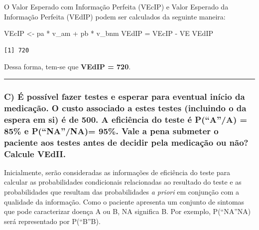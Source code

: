 \documentclass[
  letterpaper,
  DIV=11,
  numbers=noendperiod]{scrartcl}
\newenvironment{Shaded}{\begin{snugshade}}{\end{snugshade}}
\newcommand{\NormalTok}[1]{\textcolor[rgb]{0.00,0.23,0.31}{#1}}
\newcommand{\OtherTok}[1]{\textcolor[rgb]{0.00,0.23,0.31}{#1}}
\newcommand{\SpecialCharTok}[1]{\textcolor[rgb]{0.37,0.37,0.37}{#1}}
\begin{document}
O Valor Esperado com Informação Perfeita (VEcIP) e Valor Esperado da
Informação Perfeita (VEdIP) podem ser calculados da seguinte maneira:

\begin{Shaded}
\begin{Highlighting}[]
\NormalTok{VEcIP }\OtherTok{\textless{}{-}}\NormalTok{ pa }\SpecialCharTok{*}\NormalTok{ v\_am }\SpecialCharTok{+}\NormalTok{ pb }\SpecialCharTok{*}\NormalTok{ v\_bnm}
\NormalTok{VEdIP }\OtherTok{=}\NormalTok{ VEcIP }\SpecialCharTok{{-}}\NormalTok{ VE}
\NormalTok{VEdIP}
\end{Highlighting}
\end{Shaded}

\begin{verbatim}
[1] 720
\end{verbatim}

Dessa forma, tem-se que \textbf{VEdIP = 720}.

\begin{center}\rule{0.5\linewidth}{0.5pt}\end{center}

\hypertarget{c-uxe9-possuxedvel-fazer-testes-e-esperar-para-eventual-inuxedcio-da-medicauxe7uxe3o.-o-custo-associado-a-estes-testes-incluindo-o-da-espera-em-si-uxe9-de-500.-a-eficiuxeancia-do-teste-uxe9-paa-85-e-pnana-95.-vale-a-pena-submeter-o-paciente-aos-testes-antes-de-decidir-pela-medicauxe7uxe3o-ou-nuxe3o-calcule-vedii.}{%
\subsubsection{C) É possível fazer testes e esperar para eventual início
da medicação. O custo associado a estes testes (incluindo o da espera em
si) é de 500. A eficiência do teste é P(``A''/A) = 85\% e P(``NA''/NA)=
95\%. Vale a pena submeter o paciente aos testes antes de decidir pela
medicação ou não? Calcule
VEdII.}\label{c-uxe9-possuxedvel-fazer-testes-e-esperar-para-eventual-inuxedcio-da-medicauxe7uxe3o.-o-custo-associado-a-estes-testes-incluindo-o-da-espera-em-si-uxe9-de-500.-a-eficiuxeancia-do-teste-uxe9-paa-85-e-pnana-95.-vale-a-pena-submeter-o-paciente-aos-testes-antes-de-decidir-pela-medicauxe7uxe3o-ou-nuxe3o-calcule-vedii.}}

Inicialmente, serão consideradas as informações de eficiência do teste
para calcular as probabilidades condicionais relacionadas ao resultado
do teste e as probabilidades que resultam das probabilidades \emph{a
priori} em conjunção com a qualidade da informação. Como o paciente
apresenta um conjunto de sintomas que pode caracterizar doença A ou B,
NA significa B. Por exemplo, P(``NA''\textbar NA) será representado por
P(``B''\textbar B).
\end{document}

